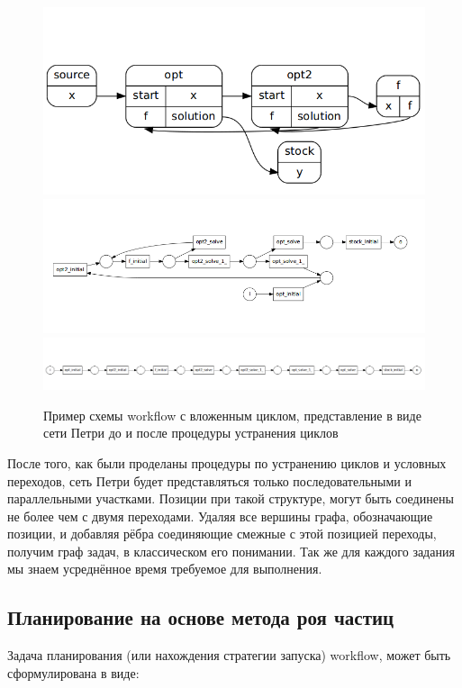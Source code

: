 \documentclass[a4paper,12pt]{article}
\begin{document}
		
\begin{figure}[!h]
\caption{Пример схемы workflow с вложенным циклом, представление в виде сети Петри до и после процедуры устранения циклов}
\centering
\includegraphics[scale=0.45]{double_opt2.png}
\includegraphics[scale=0.45]{double_opt_petri1.png}\\

\includegraphics[scale=0.35]{double_opt_petri2.png}
\label{pic:race_cond}
\label{pic:petri_tansform}
\end{figure}

После того, как были проделаны процедуры по устранению циклов и условных переходов, сеть Петри будет представляться только последовательными и параллельными участками. Позиции при такой структуре, могут быть соединены не более чем с двумя переходами. Удаляя все вершины графа, обозначающие позиции, и добавляя рёбра соединяющие смежные с этой позицией переходы, получим граф задач, в классическом его понимании. Так же для каждого задания мы знаем усреднённое время требуемое для выполнения.

\subsection{Планирование на основе метода роя частиц}
Задача планирования (или нахождения стратегии запуска) workflow, может быть сформулирована в виде:
\end{document}

